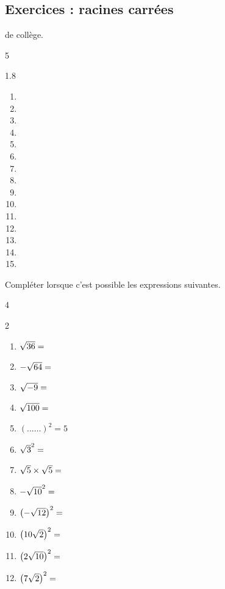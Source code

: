 \documentclass[main.tex]{subfiles}
\begin{document}
\subsection{Exercices : racines carrées}
\begin{example}  de collège.\hfill 
	\begin{multicols}{5}
		\begin{spacing}{1.8}
		\begin{enumerate}[label={$\arabic*^2=$}]
			\item 
			\item 
			\item 
			\item 
			\item 
			\item 
			\item 
			\item 
			\item 
			\item 
			\item 
			\item 
			\item 
			\item 
			\item 
		\end{enumerate} 
	\end{spacing}
	\end{multicols}
\end{example} 

\begin{exercise}[\cancel{\faCalculator}] Compléter lorsque c'est possible les expressions suivantes.
	\begin{multicols}{4}
		\begin{spacing}{2} 
			\begin{enumerate}[label={}, leftmargin=*]   
				\item $\sqrt{36}=\dotfill $
				\item $-\sqrt{64}=\dotfill $
				\item $\sqrt{-9}=\dotfill $
				\item $\sqrt{100}=\dotfill $
				\item $\left( \ldots\ldots\right)^2=5 $
				\item $\sqrt{3}^2=\dotfill $ 
				\item $\sqrt{5}\times \sqrt{5}=\dotfill $
				\item $-\sqrt{10}^2=\dotfill $
				\item $\left(-\sqrt{12}\right)^2=\dotfill$
				\item $\left(10\sqrt{2}\right)^2= \dotfill $
				\item $\left(2\sqrt{10}\right)^2= \dotfill $
				\item $\left(7\sqrt{2}\right)^2= \dotfill $ 
			\end{enumerate}
		\end{spacing}
	\end{multicols}
\end{exercise}
 
\end{document}
